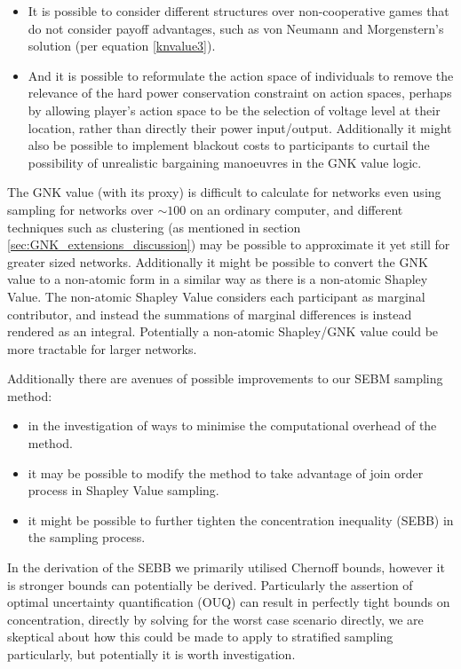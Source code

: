 \begin{itemize}
\item	It is possible to consider different structures over non-cooperative games that do not consider payoff advantages, such as von Neumann and Morgenstern's solution (per equation \ref{knvalue3}).
\item	And it is possible to reformulate the action space of individuals to remove the relevance of the hard power conservation constraint on action spaces, perhaps by allowing player's action space to be the selection of voltage level at their location, rather than directly their power input/output. Additionally it might also be possible to implement blackout costs to participants to curtail the possibility of unrealistic bargaining manoeuvres in the GNK value logic.
\end{itemize}


The GNK value (with its proxy) is difficult to calculate for networks even using sampling for networks over $\sim 100$ on an ordinary computer, and different techniques such as clustering (as mentioned in section \ref{sec:GNK_extensions_discussion}) may be possible to approximate it yet still for greater sized networks.
Additionally it might be possible to convert the GNK value to a non-atomic form in a similar way as there is a non-atomic Shapley Value.
The non-atomic Shapley Value considers each participant as marginal contributor, and instead the summations of marginal differences is instead rendered as an integral. Potentially a non-atomic Shapley/GNK value could be more tractable for larger networks.

Additionally there are avenues of possible improvements to our SEBM sampling method:
\begin{itemize}
\item	in the investigation of ways to minimise the computational overhead of the method.
\item	it may be possible to modify the method to take advantage of join order process in Shapley Value sampling.
\item	it might be possible to further tighten the concentration inequality (SEBB) in the sampling process.
\end{itemize}

In the derivation of the SEBB we primarily utilised Chernoff bounds, however it is stronger bounds can potentially be derived.
Particularly the assertion of optimal uncertainty quantification (OUQ) can result in perfectly tight bounds on concentration, directly by solving for the worst case scenario directly, we are skeptical about how this could be made to apply to stratified sampling particularly, but potentially it is worth investigation.\citep{OUQ1,doi:10.1137/13094712X}

